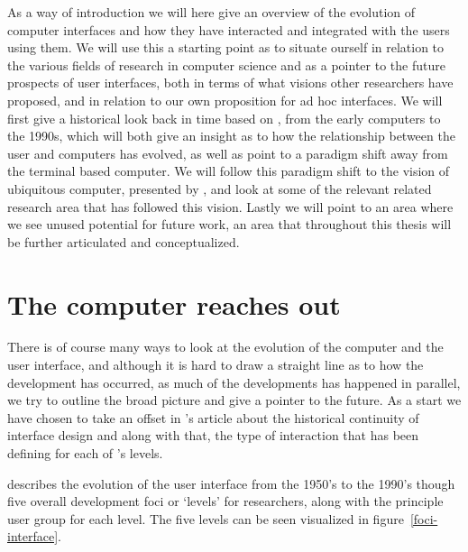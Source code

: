 As a way of introduction we will here give an overview of the evolution of computer interfaces and how they have interacted and integrated with the users using them.
We will use this a starting point as to situate ourself in relation to the various fields of research in computer science and as a pointer to the future prospects of user interfaces, both in terms of what visions other researchers have proposed, and in relation to our own proposition for ad hoc interfaces.
We will first give a historical look back in time based on \citet{grudin1990computer}, from the early computers to the 1990s, which will both give an insight as to how the relationship between the user and computers has evolved, as well as point to a paradigm shift away from the terminal based computer.
We will follow this paradigm shift to the vision of ubiquitous computer, presented by \citet{weiser1991computer}, and look at some of the relevant related research area that has followed this vision.
Lastly we will point to an area where we see unused potential for future work, an area that throughout this thesis will be further articulated and conceptualized.   

\section{The computer reaches out}
There is of course many ways to look at the evolution of the computer and the user interface, and although it is hard to draw a straight line as to how the development has occurred, as much of the developments has happened in parallel, we try to outline the broad picture and give a pointer to the future.
As a start we have chosen to take an offset in \citeauthor{grudin1990computer}'s article about the historical continuity of interface design \citep{grudin1990computer} and along with that, the type of interaction that has been defining for each of \citeauthor{grudin1990computer}'s levels.

\citeauthor{grudin1990computer} describes the evolution of the user interface from the 1950's to the 1990's though five overall development foci or `levels' for researchers, along with the principle user group for each level.
The five levels can be seen visualized in figure~\ref{foci-interface}.

